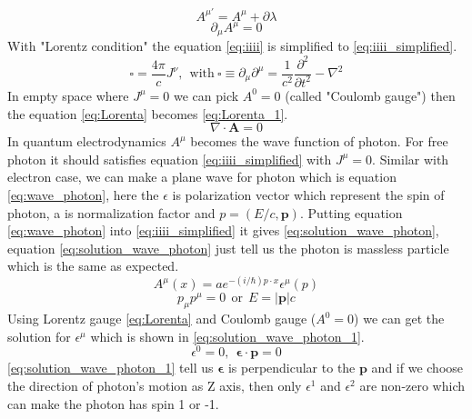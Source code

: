 \begin{equation}
A^{\mu'}=A^{\mu}+\partial\lambda
\label{eq:Gauge}
\end{equation}
\begin{equation}
\partial_{\mu}A^{\mu}=0
\label{eq:Lorenta}
\end{equation}
With "Lorentz condition" the equation \ref{eq:iiii} is simplified to \ref{eq:iiii_simplified}.
\begin{equation}
\square=\frac{4\pi}{c}J^{\nu},~~\mathrm{with}~\square\equiv\partial_{\mu}\partial^{\mu}=\frac{1}{c^{2}}\frac{\partial^{2}}{\partial t^{2}}-\nabla^{2}
\label{eq:iiii_simplified}
\end{equation}
In empty space where $J^{\mu}=0$ we can pick $A^{0}=0$ (called "Coulomb gauge") then the equation \ref{eq:Lorenta} becomes \ref{eq:Lorenta_1}.
\begin{equation}
\nabla\cdot \mathbf{A}=0
\label{eq:Lorenta_1}
\end{equation}
In quantum electrodynamics $A^{\mu}$ becomes the wave function of photon. For free photon it should satisfies equation \ref{eq:iiii_simplified} with $J^{\mu}=0$. Similar with electron case, we can make a plane wave for photon which is equation \ref{eq:wave_photon}, here the $\epsilon$ is polarization vector which represent the spin of photon, a is normalization factor and $p=(E/c,\mathbf{p})$. Putting equation \ref{eq:wave_photon} into \ref{eq:iiii_simplified} it gives \ref{eq:solution_wave_photon}, equation \ref{eq:solution_wave_photon} just tell us the photon is massless particle which is the same as expected.
\begin{equation}
A^{\mu}(x)=ae^{-(i/\hbar)p\cdot x}\epsilon^{\mu}(p)
\label{eq:wave_photon}
\end{equation}
\begin{equation}
p_{\mu}p^{\mu}=0~~\mathrm{or}~~E=|\mathbf{p}|c
\label{eq:solution_wave_photon}
\end{equation}
Using Lorentz gauge \ref{eq:Lorenta} and Coulomb gauge ($A^{0}=0$) we can get the solution for $\epsilon^{\mu}$ which is shown in \ref{eq:solution_wave_photon_1}.
\begin{equation}
\epsilon^{0}=0,~~\mathbf{\epsilon}\cdot\mathbf{p}=0
\label{eq:solution_wave_photon_1}
\end{equation}
\ref{eq:solution_wave_photon_1} tell us $\mathbf{\epsilon}$ is perpendicular to the $\mathbf{p}$ and if we choose the direction of photon's motion as Z axis, then only $\epsilon^{1}$ and $\epsilon^{2}$ are non-zero which can make the photon has spin 1 or -1.

